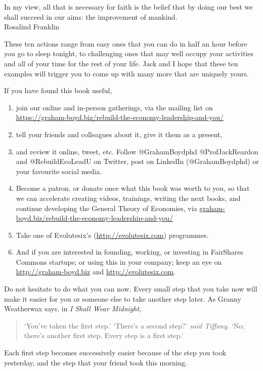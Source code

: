 \begin{chapterquotation}
In my view, all that is necessary for faith is the belief that by doing our best we shall succeed in our aims: the improvement of mankind.\\
\raggedleft\textemdash Rosalind Franklin
\end{chapterquotation}


These ten actions range from easy ones that you can do in half an hour before you go to sleep tonight, to challenging ones that may well occupy your activities and all of your time for the rest of your life. Jack and I hope that these ten examples will trigger you to come up with many more that are uniquely yours.


If you have found this book useful, 


\begin{enumerate}
\item join our online and in-person gatherings, via the mailing list on \url{https://graham-boyd.biz/rebuild-the-economy-leadership-and-you/} 
\item tell your friends and colleagues about it, give it them as a present, 
\item and review it online, tweet, etc. Follow @GrahamBoydphd \newline @ProfJackReardon and @RebuildEcoLeadU on Twitter, post on LinkedIn (@GrahamBoydphd) or your favourite social media.
\item Become a patron, or donate once what this book was worth to you, so that we can accelerate creating videos, trainings, writing the next books, and continue developing the General Theory of Economies, via \url{graham-boyd.biz/rebuild-the-economy-leadership-and-you/} 
\item Take one of Evolutesix’s (\url{http://evolutesix.com}) programmes.
\item And if you are interested in founding, working, or investing in FairShares Commons startups; or using this in your company; keep an eye on \newline \url{http://graham-boyd.biz} and \url{http://evolutesix.com}.
\end{enumerate}


Do not hesitate to do what you can now. Every small step that you take now will make it easier for you or someone else to take another step later. As Granny Weatherwax says, in \emph{I Shall Wear Midnight}\cite{pratchett-wear-midnight}, 
\begin{quote}
‘You've taken the first step.’ \newline
‘There's a second step?’ \emph{said Tiffany.} \newline
‘No; there's another first step. Every step is a first step.’
\end{quote}
Each first step becomes successively easier because of the step you took yesterday, and the step that your friend took this morning. 


